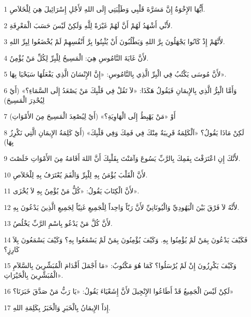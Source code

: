 \par 1 أَيُّهَا الإِخْوَةُ إِنَّ مَسَرَّةَ قَلْبِي وَطَلِْبَتِي إِلَى اللهِ لأَجْلِ إِسْرَائِيلَ هِيَ لِلْخَلاَصِ.
\par 2 لأَنِّي أَشْهَدُ لَهُمْ أَنَّ لَهُمْ غَيْرَةً لِلَّهِ وَلَكِنْ لَيْسَ حَسَبَ الْمَعْرِفَةِ.
\par 3 لأَنَّهُمْ إِذْ كَانُوا يَجْهَلُونَ بِرَّ اللهِ وَيَطْلُبُونَ أَنْ يُثْبِتُوا بِرَّ أَنْفُسِهِمْ لَمْ يُخْضَعُوا لِبِرِّ اللهِ.
\par 4 لأَنَّ غَايَةَ النَّامُوسِ هِيَ: الْمَسِيحُ لِلْبِرِّ لِكُلِّ مَنْ يُؤْمِنُ.
\par 5 لأَنَّ مُوسَى يَكْتُبُ فِي الْبِرِّ الَّذِي بِالنَّامُوسِ: «إِنَّ الإِنْسَانَ الَّذِي يَفْعَلُهَا سَيَحْيَا بِهَا».
\par 6 وَأَمَّا الْبِرُّ الَّذِي بِالإِيمَانِ فَيَقُولُ هَكَذَا: «لاَ تَقُلْ فِي قَلْبِكَ مَنْ يَصْعَدُ إِلَى السَّمَاءِ؟» (أَيْ لِيُحْدِرَ الْمَسِيحَ)
\par 7 أَوْ «مَنْ يَهْبِطُ إِلَى الْهَاوِيَةِ؟» (أَيْ لِيُصْعِدَ الْمَسِيحَ مِنَ الأَمْوَاتِ)
\par 8 لَكِنْ مَاذَا يَقُولُ؟ «اَلْكَلِمَةُ قَرِيبَةٌ مِنْكَ فِي فَمِكَ وَفِي قَلْبِكَ» (أَيْ كَلِمَةُ الإِيمَانِ الَّتِي نَكْرِزُ بِهَا)
\par 9 لأَنَّكَ إِنِ اعْتَرَفْتَ بِفَمِكَ بِالرَّبِّ يَسُوعَ وَآمَنْتَ بِقَلْبِكَ أَنَّ اللهَ أَقَامَهُ مِنَ الأَمْوَاتِ خَلَصْتَ.
\par 10 لأَنَّ الْقَلْبَ يُؤْمَنُ بِهِ لِلْبِرِّ وَالْفَمَ يُعْتَرَفُ بِهِ لِلْخَلاَصِ.
\par 11 لأَنَّ الْكِتَابَ يَقُولُ: «كُلُّ مَنْ يُؤْمِنُ بِهِ لاَ يُخْزَى».
\par 12 لأَنَّهُ لاَ فَرْقَ بَيْنَ الْيَهُودِيِّ وَالْيُونَانِيِّ لأَنَّ رَبّاً وَاحِداً لِلْجَمِيعِ غَنِيّاً لِجَمِيعِ الَّذِينَ يَدْعُونَ بِهِ.
\par 13 لأَنَّ كُلَّ مَنْ يَدْعُو بِاسْمِ الرَّبِّ يَخْلُصُ.
\par 14 فَكَيْفَ يَدْعُونَ بِمَنْ لَمْ يُؤْمِنُوا بِهِ. وَكَيْفَ يُؤْمِنُونَ بِمَنْ لَمْ يَسْمَعُوا بِهِ؟ وَكَيْفَ يَسْمَعُونَ بِلاَ كَارِزٍ؟
\par 15 وَكَيْفَ يَكْرِزُونَ إِنْ لَمْ يُرْسَلُوا؟ كَمَا هُوَ مَكْتُوبٌ: «مَا أَجْمَلَ أَقْدَامَ الْمُبَشِّرِينَ بِالسَّلاَمِ الْمُبَشِّرِينَ بِالْخَيْرَاتِ».
\par 16 لَكِنْ لَيْسَ الْجَمِيعُ قَدْ أَطَاعُوا الإِنْجِيلَ لأَنَّ إِشَعْيَاءَ يَقُولُ: «يَا رَبُّ مَنْ صَدَّقَ خَبَرَنَا؟»
\par 17 إِذاً الإِيمَانُ بِالْخَبَرِ وَالْخَبَرُ بِكَلِمَةِ اللهِ.
